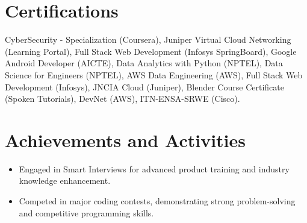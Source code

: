 \documentclass[a4paper,10pt]{article}
\begin{document}
\section{Certifications}


\textrm{
\hspace{-3pt}CyberSecurity - Specialization (Coursera), Juniper Virtual Cloud Networking (Learning Portal), Full Stack Web Development (Infosys SpringBoard), Google Android Developer (AICTE), Data Analytics with Python (NPTEL), Data Science for Engineers (NPTEL), AWS Data Engineering (AWS), Full Stack Web Development (Infosys), JNCIA Cloud (Juniper), Blender Course Certificate (Spoken Tutorials), DevNet (AWS), ITN-ENSA-SRWE (Cisco).
}




\section{Achievements and Activities}

\vspace{5pt}
\begin{itemize}

    \item Engaged in Smart Interviews for advanced product training and industry knowledge enhancement.\vspace{-5pt}
    \item Competed in major coding contests, demonstrating strong problem-solving and competitive programming skills.\vspace{-5pt}
\end{itemize}
\end{document}
